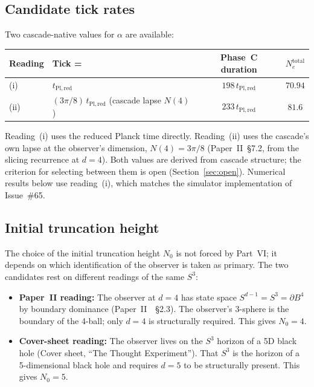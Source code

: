 \documentclass[12pt,a4paper]{article}
\begin{document}
\subsection{Candidate tick rates}

Two cascade-native values for $\alpha$ are available:

\begin{center}
\renewcommand{\arraystretch}{1.25}
\begin{tabular}{llcc}
\toprule
Reading & Tick = & Phase~C duration & $N_e^{\mathrm{total}}$ \\
\midrule
(i) & $t_{\mathrm{Pl,red}}$ & $198\,t_{\mathrm{Pl,red}}$ & $70.94$ \\
(ii) & $(3\pi/8)\,t_{\mathrm{Pl,red}}$ (cascade lapse $N(4)$) &
      $233\,t_{\mathrm{Pl,red}}$ & $81.6$ \\
\bottomrule
\end{tabular}
\end{center}

Reading~(i) uses the reduced Planck time directly. Reading~(ii) uses the
cascade's own lapse at the observer's dimension, $N(4) = 3\pi/8$ (Paper~II~\S7.2,
from the slicing recurrence at $d = 4$). Both values are derived from cascade
structure; the criterion for selecting between them is open (Section~\ref{sec:open}).
Numerical results below use reading~(i), which matches the simulator
implementation of Issue~\#65.

\subsection{Initial truncation height}\label{subsec:N0}

The choice of the initial truncation height $N_0$ is not forced by Part~VI;
it depends on which identification of the observer is taken as primary. The
two candidates rest on different readings of the same $S^3$:

\begin{itemize}[leftmargin=*,nosep]
\item \textbf{Paper~II reading:} The observer at $d = 4$ has state space
$S^{d-1} = S^3 = \partial B^4$ by boundary dominance
(Paper~II~\cite{part2}~\S2.3). The observer's 3-sphere is the boundary of
the 4-ball; only $d = 4$ is structurally required. This gives $N_0 = 4$.
\item \textbf{Cover-sheet reading:} The observer lives on the $S^3$ horizon
of a 5D black hole (Cover sheet, ``The Thought Experiment''). That $S^3$ is
the horizon of a 5-dimensional black hole and requires $d = 5$ to be
structurally present. This gives $N_0 = 5$.
\end{itemize}
\end{document}
